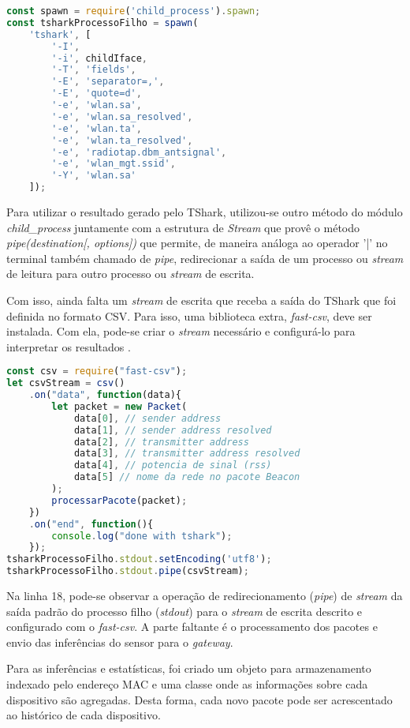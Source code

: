 \begin{lstlisting}[language=javascript,caption={TShark e opções executado pelo Node.js},label=code-node-tshark]
const spawn = require('child_process').spawn;
const tsharkProcessoFilho = spawn(
	'tshark', [
		'-I',
		'-i', childIface,
		'-T', 'fields',
		'-E', 'separator=,',
		'-E', 'quote=d',
		'-e', 'wlan.sa',
		'-e', 'wlan.sa_resolved',
		'-e', 'wlan.ta',
		'-e', 'wlan.ta_resolved',
		'-e', 'radiotap.dbm_antsignal',
		'-e', 'wlan_mgt.ssid',
		'-Y', 'wlan.sa'
	]);
\end{lstlisting}

Para utilizar o resultado gerado pelo TShark, utilizou-se outro método do
módulo \emph{child\_process} juntamente com a estrutura de \emph{Stream}
\cite{stream} que provê o método \emph{pipe(destination[, options])} que permite,
de maneira análoga ao operador '|' no terminal também chamado de \emph{pipe},
redirecionar a saída de um processo ou \emph{stream} de leitura para outro
processo ou \emph{stream} de escrita.

Com isso, ainda falta um \emph{stream} de escrita que receba a saída do
TShark que foi definida no formato CSV. Para isso, uma biblioteca extra,
\emph{fast-csv}, deve ser instalada. Com ela, pode-se criar o \emph{stream}
necessário e configurá-lo para interpretar os resultados \cite{fast-csv}.

\begin{lstlisting}[language=javascript,caption={Uso do fast-csv},label=code-node-csv]
const csv = require("fast-csv");
let csvStream = csv()
	.on("data", function(data){
		let packet = new Packet(
			data[0], // sender address
			data[1], // sender address resolved
			data[2], // transmitter address
			data[3], // transmitter address resolved
			data[4], // potencia de sinal (rss)
			data[5] // nome da rede no pacote Beacon
		);
		processarPacote(packet);
	})
	.on("end", function(){
		console.log("done with tshark");
	});
tsharkProcessoFilho.stdout.setEncoding('utf8');
tsharkProcessoFilho.stdout.pipe(csvStream);
\end{lstlisting}

Na linha 18, pode-se observar a operação de redirecionamento (\emph{pipe})
de \emph{stream} da saída padrão do processo filho (\emph{stdout}) para o
\emph{stream} de escrita descrito e configurado com o \emph{fast-csv}. A parte
faltante é o processamento dos pacotes e envio das inferências do sensor para o
\emph{gateway}.

Para as inferências e estatísticas, foi criado um objeto para armazenamento indexado
pelo endereço MAC e uma classe onde as informações
sobre cada dispositivo são agregadas. Desta forma, cada novo pacote pode ser acrescentado ao
histórico de cada dispositivo.


